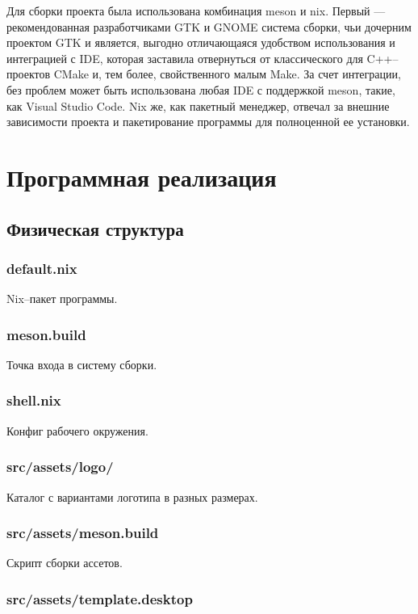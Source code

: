 \documentclass[variant=courcework]{bsuir}
\begin{document}
Для сборки проекта была использована комбинация meson и nix. Первый ---
рекомендованная разработчиками GTK и GNOME система сборки, чьи дочерним проектом
GTK и является, выгодно отличающаяся удобством использования и интеграцией с
IDE, которая заставила отвернуться от классического для C++--проектов CMake и,
тем более, свойственного малым Make. За счет интеграции, без проблем может быть
использована любая IDE с поддержкой meson, такие, как Visual Studio Code. Nix
же, как пакетный менеджер, отвечал за внешние зависимости проекта и
пакетирование программы для полноценной ее установки.

\chapter{Программная реализация}

\section{Физическая структура}

\subsection*{default.nix}

Nix--пакет программы.

\subsection{meson.build}

Точка входа в систему сборки.

\subsection{shell.nix}

Конфиг рабочего окружения.

\subsection{src/assets/logo/}

Каталог с вариантами логотипа в разных размерах.

\subsection{src/assets/meson.build}

Скрипт сборки ассетов.

\subsection{src/assets/template.desktop}
\end{document}
